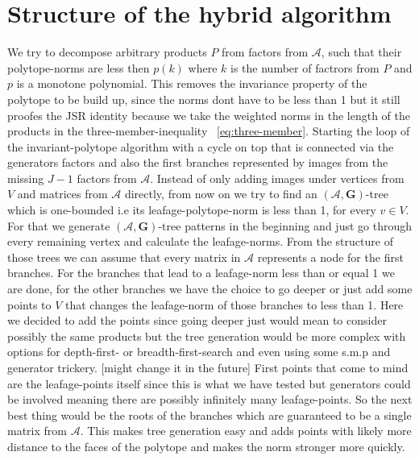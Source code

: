 

\section{Structure of the hybrid algorithm}

We try to decompose arbitrary products $P$ from factors from $\mathcal{A}$, such that their polytope-norms are less then $p(k)$ where $k$ is the number of factrors from $P$ and $p$ is a monotone polynomial.
This removes the invariance property of the polytope to be build up, since the norms dont have to be less than 1 but it still proofes the JSR identity because we take the weighted norms in the length of the products in the three-member-inequality ~\ref{eq:three-member}.
\newline 
Starting the loop of the invariant-polytope algorithm with a cycle on top that is connected via the generators factors and also the first branches represented by images from the missing $J-1$ factors from $\mathcal{A}$. Instead of only adding images under vertices from $V$ and matrices from $\mathcal{A}$ directly, from now on we try to find an $(\mathcal{A},\mathbf{G})\text{-tree}$ which is one-bounded i.e its leafage-polytope-norm is less than 1, for every $v \in V$.
For that we generate $(\mathcal{A},\mathbf{G})\text{-tree}$ patterns in the beginning and just go through every remaining vertex and calculate the leafage-norms. From the structure of those trees we can assume that every matrix in $\mathcal{A}$ represents a node for the first branches.
For the branches that lead to a leafage-norm less than or equal 1 we are done, for the other branches we have the choice to go deeper or just add some points to $V$ that changes the leafage-norm of those branches to less than 1. Here we decided to add the points since going deeper just would mean to consider possibly the same products but the tree generation would be more complex with options for depth-first- or breadth-first-search and even using some s.m.p and generator trickery. [might change it in the future]
\newline
First points that come to mind are the leafage-points itself since this is what we have tested but generators could be involved meaning there are possibly infinitely many leafage-points. So the next best thing would be the roots of the branches which are guaranteed to be a single matrix from $\mathcal{A}$. This makes tree generation easy and adds points with likely more distance to the faces of the polytope and makes the norm stronger more quickly.
